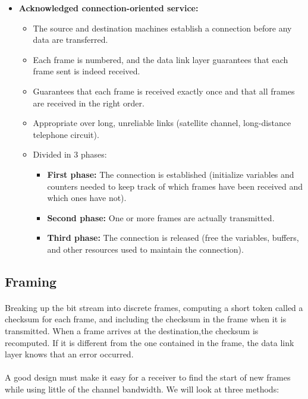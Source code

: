 \documentclass[../resumosRCOM.tex]{subfiles}
\begin{document}
\begin{itemize}
    \item \textbf{Acknowledged connection-oriented service: }
    \begin{itemize}
        \item The source and destination machines establish a connection 
        before any data are transferred.
        \item Each frame is numbered, and the data link layer guarantees 
        that each frame sent is indeed received.
        \item Guarantees that each frame is received exactly once and 
        that all frames are received in the right order.
        \item Appropriate over long, unreliable links (satellite channel,
         long-distance telephone circuit).
        \item Divided in 3 phases:
        \begin{itemize}
            \item \textbf{First phase: }The connection is established 
            (initialize variables and counters needed to keep track of
            which frames have been received and which ones have not).
            \item \textbf{Second phase: } One or more frames are actually 
            transmitted.
            \item \textbf{Third phase: } The connection is released (free
            the variables, buffers, and other resources used to maintain 
            the connection).
        \end{itemize}
    \end{itemize}
\end{itemize}

\subsection{Framing}
\paragraph{}
Breaking up the bit stream into discrete frames, computing a short token called a
checksum for each frame, and including the checksum in the frame when it is 
transmitted.
When a frame arrives at the destination,the checksum is recomputed. 
If it is different from the one contained in the frame, the data link layer
knows that an error occurred.
\paragraph{}
A good design must make it easy for a receiver to find the start of new frames
while using little of the channel bandwidth. We will look at three methods:
\end{document}
